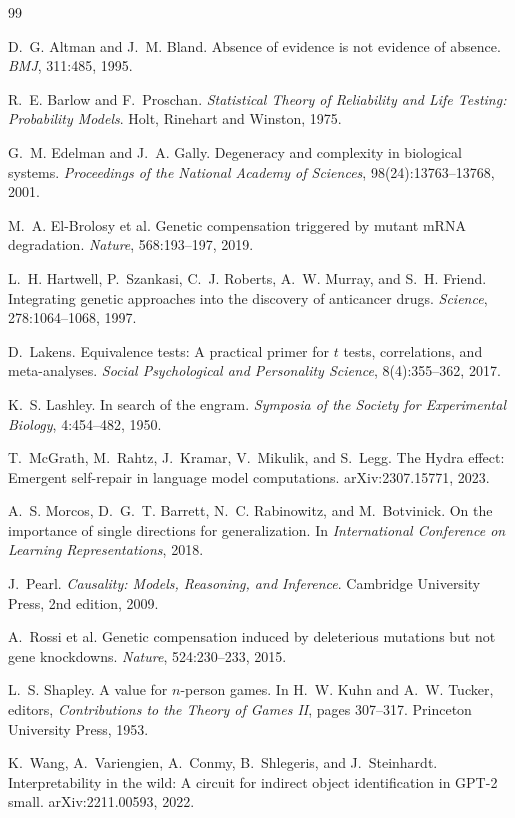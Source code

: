 \documentclass[11pt]{article}
\theoremstyle{definition}
\theoremstyle{remark}
\begin{document}
\begin{thebibliography}{99}

D.~G. Altman and J.~M. Bland.
\newblock Absence of evidence is not evidence of absence.
\newblock \emph{BMJ}, 311:485, 1995.

R.~E. Barlow and F.~Proschan.
\newblock \emph{Statistical Theory of Reliability and Life Testing: Probability Models}.
\newblock Holt, Rinehart and Winston, 1975.

G.~M. Edelman and J.~A. Gally.
\newblock Degeneracy and complexity in biological systems.
\newblock \emph{Proceedings of the National Academy of Sciences}, 98(24):13763--13768, 2001.

M.~A. El-Brolosy et al.
\newblock Genetic compensation triggered by mutant mRNA degradation.
\newblock \emph{Nature}, 568:193--197, 2019.

L.~H. Hartwell, P.~Szankasi, C.~J. Roberts, A.~W. Murray, and S.~H. Friend.
\newblock Integrating genetic approaches into the discovery of anticancer drugs.
\newblock \emph{Science}, 278:1064--1068, 1997.

D.~Lakens.
\newblock Equivalence tests: A practical primer for $t$ tests, correlations, and meta-analyses.
\newblock \emph{Social Psychological and Personality Science}, 8(4):355--362, 2017.

K.~S. Lashley.
\newblock In search of the engram.
\newblock \emph{Symposia of the Society for Experimental Biology}, 4:454--482, 1950.

T.~McGrath, M.~Rahtz, J.~Kramar, V.~Mikulik, and S.~Legg.
\newblock The Hydra effect: Emergent self-repair in language model computations.
\newblock arXiv:2307.15771, 2023.

A.~S. Morcos, D.~G.~T. Barrett, N.~C. Rabinowitz, and M.~Botvinick.
\newblock On the importance of single directions for generalization.
\newblock In \emph{International Conference on Learning Representations}, 2018.

J.~Pearl.
\newblock \emph{Causality: Models, Reasoning, and Inference}.
\newblock Cambridge University Press, 2nd edition, 2009.

A.~Rossi et al.
\newblock Genetic compensation induced by deleterious mutations but not gene knockdowns.
\newblock \emph{Nature}, 524:230--233, 2015.

L.~S. Shapley.
\newblock A value for $n$-person games.
\newblock In H.~W. Kuhn and A.~W. Tucker, editors, \emph{Contributions to the Theory of Games II}, pages 307--317. Princeton University Press, 1953.

K.~Wang, A.~Variengien, A.~Conmy, B.~Shlegeris, and J.~Steinhardt.
\newblock Interpretability in the wild: A circuit for indirect object identification in GPT-2 small.
\newblock arXiv:2211.00593, 2022.

\end{thebibliography}
\end{document}
